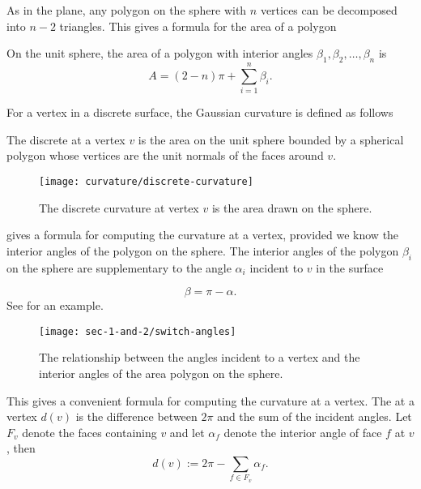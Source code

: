 As in the plane, any polygon on the sphere with $n$ vertices can be decomposed
into $n-2$ triangles. This gives a formula for the area of a polygon

\begin{corollary}\label{cor:sphere-area}
On the unit sphere, the area of a polygon with interior angles
$\beta_1,\beta_2,\ldots, \beta_n$
is $$A=(2-n)\pi +\sum_{i=1}^n \beta_i.$$

\end{corollary}

For a vertex in a discrete surface, the Gaussian curvature is defined as
follows

\begin{definition}\label{def:discrete-curvature-vertex}

The discrete  at a vertex $v$ is the area on the unit sphere bounded by a spherical polygon whose vertices are the unit normals of the faces around $v$.

\end{definition}


\begin{figure}[htb]
\centering
\texttt{[image: curvature/discrete-curvature]}
\caption{The discrete curvature at vertex $v$ is the area drawn on the sphere.}
\label{fig:discrete-curvature}
\end{figure}


 gives a formula for computing the curvature at a vertex, provided
we know the interior angles of the polygon on the sphere.
The interior angles of the polygon $\beta_i$ on the sphere are supplementary to
the angle $\alpha_i$ incident to $v$ in the surface

\begin{equation} \label{eqn:switcheroo}
\beta=\pi-\alpha.
\end{equation}
See  for an example.




\begin{figure}[htb]
\centering
\texttt{[image: sec-1-and-2/switch-angles]}
\caption{The relationship between the angles incident to a vertex and
the interior angles of the area polygon on the sphere.}
\label{fig:switcheroo}
\end{figure}




This gives a convenient formula for computing the curvature at a vertex.
The  at a vertex $d(v)$ is the difference between $2\pi$ and
the sum of the incident angles.  Let $F_v$ denote the faces containing $v$  
and let $\alpha_f$  denote the interior  angle of face $f$ at $v$, then
$$d(v):=2\pi -\sum_{f\in F_v}\alpha_f.$$

